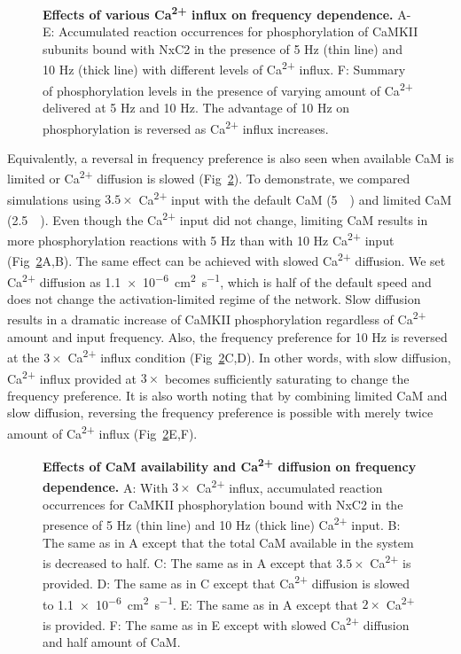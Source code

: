 \documentclass[10pt,letterpaper]{article}
\begin{document}
\begin{figure}[!h]
	\caption{{\bf Effects of various Ca\textsuperscript{2+} influx on frequency dependence.}
	A-E: Accumulated reaction occurrences for phosphorylation of CaMKII subunits bound with NxC2 in the presence of 5 Hz (thin line) and 10 Hz (thick line) with different levels of Ca\textsuperscript{2+} influx. 
	F: Summary of phosphorylation levels in the presence of varying amount of Ca\textsuperscript{2+} delivered at 5 Hz and 10 Hz. The advantage of 10 Hz on phosphorylation is reversed as Ca\textsuperscript{2+} influx increases.
	}
\label{fig9}
\end{figure}

Equivalently, a reversal in frequency preference is also seen when available CaM is limited or Ca\textsuperscript{2+} diffusion is slowed (Fig~\ref{fig10}). To demonstrate, we compared simulations using $3.5\times$ Ca\textsuperscript{2+} input with the default CaM (\SI{5}{\micro\Molar}) and limited CaM (\SI{2.5}{\micro\Molar}). Even though the Ca\textsuperscript{2+} input did not change, limiting CaM results in more phosphorylation reactions with 5 Hz than with 10 Hz Ca\textsuperscript{2+} input (Fig~\ref{fig10}A,B). The same effect can be achieved with slowed Ca\textsuperscript{2+} diffusion. We set Ca\textsuperscript{2+} diffusion as \SI{1.1e-6}{\square\cm\per\s}, which is half of the default speed and does not change the activation-limited regime of the network. Slow diffusion results in a dramatic increase of CaMKII phosphorylation regardless of Ca\textsuperscript{2+} amount and input frequency. Also, the frequency preference for 10 Hz is reversed at the $3\times$ Ca\textsuperscript{2+} influx condition (Fig~\ref{fig10}C,D). In other words, with slow diffusion, Ca\textsuperscript{2+} influx provided at $3\times$ becomes sufficiently saturating to change the frequency preference. It is also worth noting that by combining limited CaM and slow diffusion, reversing the frequency preference is possible with merely twice amount of Ca\textsuperscript{2+} influx (Fig~\ref{fig10}E,F). 

\begin{figure}[!h]
	\caption{{\bf Effects of CaM availability and Ca\textsuperscript{2+} diffusion on frequency dependence.}
	A: With $3\times$ Ca\textsuperscript{2+} influx, accumulated reaction occurrences for CaMKII phosphorylation bound with NxC2 in the presence of 5 Hz (thin line) and 10 Hz (thick line) Ca\textsuperscript{2+} input.
	B: The same as in A except that the total CaM available in the system is decreased to half. 
	C: The same as in A except that $3.5\times$ Ca\textsuperscript{2+} is provided.
	D: The same as in C except that Ca\textsuperscript{2+} diffusion is slowed  to \SI{1.1e-6}{\square\cm\per\s}. 
	E: The same as in A except that $2\times$ Ca\textsuperscript{2+} is provided.
	F: The same as in E except with slowed Ca\textsuperscript{2+} diffusion and half amount of CaM.
	}
\label{fig10}
\end{figure}
\end{document}
